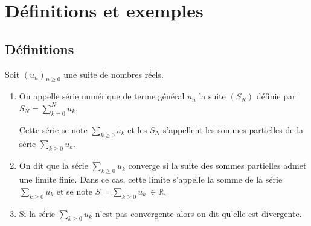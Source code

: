 \documentclass[a4paper,10pt]{book} %
\newcommand{\R}{\mathbb{R}}
\newcommand{\displayAmath}{\displaystyle}
\begin{document}
\section{Définitions et exemples}
\subsection{Définitions}
Soit $(u_n)_{n\geq 0}$ une suite de nombres réels.
\begin{enumerate}
\item On appelle série numérique de terme général $u_n$ la suite $(S_N)$ définie par $\displayAmath S_N=\sum_{k=0}^Nu_k$.

Cette série se note $\displayAmath\sum_{k\geq 0}u_k$ et les $S_N$ s'appellent les sommes partielles de la série $\displayAmath\sum_{k\geq 0}u_k$.

\item On dit que la série $\displayAmath\sum_{k\geq 0}u_k$ converge si la suite des sommes partielles admet une limite finie. Dans ce cas, cette limite s'appelle la somme de la série $\displayAmath\sum_{k\geq 0}u_k$ et se note $\displayAmath S=\sum_{k\geq 0}u_k~\in\R$.

\item Si la série $\displayAmath\sum_{k\geq 0}u_k$ n'est pas convergente alors on dit qu'elle est divergente.
\end{enumerate}
\end{document}
